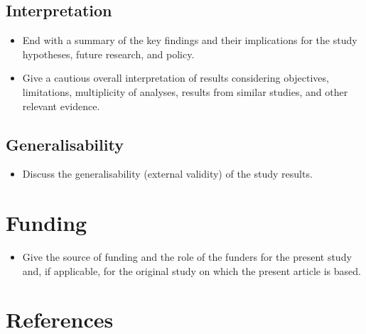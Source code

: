 \documentclass[
  letterpaper,
  DIV=11,
  numbers=noendperiod]{scrartcl}
\providecommand{\tightlist}{%
  \setlength{\itemsep}{0pt}\setlength{\parskip}{0pt}}\usepackage{longtable,booktabs,array}
\begin{document}
\subsection{Interpretation}\label{sec-interpretation}

\begin{itemize}
\tightlist
\item
  End with a summary of the key findings and their implications for the
  study hypotheses, future research, and policy.
\item
  Give a cautious overall interpretation of results considering
  objectives, limitations, multiplicity of analyses, results from
  similar studies, and other relevant evidence.
\end{itemize}

\subsection{Generalisability}\label{sec-general}

\begin{itemize}
\tightlist
\item
  Discuss the generalisability (external validity) of the study results.
\end{itemize}

\newpage

\section{Funding}\label{funding}

\begin{itemize}
\tightlist
\item
  Give the source of funding and the role of the funders for the present
  study and, if applicable, for the original study on which the present
  article is based.
\end{itemize}

\newpage

\section*{References}\label{references}
\end{document}

